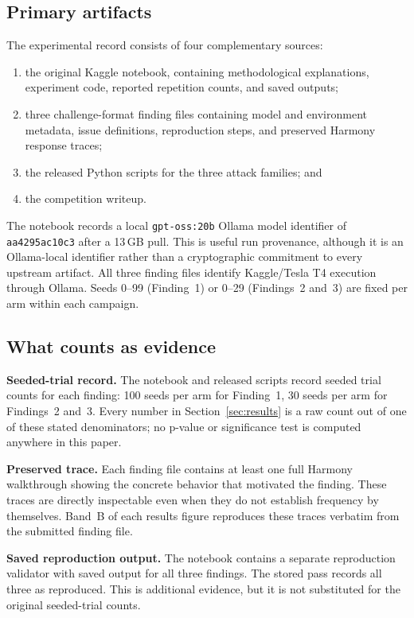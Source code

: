 \documentclass{article}
\begin{document}
\subsection{Primary artifacts}

The experimental record consists of four complementary sources:
\begin{enumerate}
  \item the original Kaggle notebook, containing methodological explanations,
  experiment code, reported repetition counts, and saved outputs;
  \item three challenge-format finding files containing model and environment
  metadata, issue definitions, reproduction steps, and preserved Harmony
  response traces;
  \item the released Python scripts for the three attack families; and
  \item the competition writeup.
\end{enumerate}

The notebook records a local \texttt{gpt-oss:20b} Ollama model identifier of
\texttt{aa4295ac10c3} after a 13\,GB pull. This is useful run provenance,
although it is an Ollama-local identifier rather than a cryptographic commitment
to every upstream artifact. All three finding files identify Kaggle/Tesla T4
execution through Ollama. Seeds 0--99 (Finding~1) or 0--29 (Findings~2 and~3)
are fixed per arm within each campaign.

\subsection{What counts as evidence}

\textbf{Seeded-trial record.} The notebook and released scripts record seeded
trial counts for each finding: 100 seeds per arm for Finding~1, 30 seeds per arm
for Findings~2 and~3. Every number in Section~\ref{sec:results} is a raw count
out of one of these stated denominators; no p-value or significance test is
computed anywhere in this paper.

\textbf{Preserved trace.} Each finding file contains at least one full Harmony
walkthrough showing the concrete behavior that motivated the finding. These
traces are directly inspectable even when they do not establish frequency by
themselves. Band~B of each results figure reproduces these traces verbatim from
the submitted finding file.

\textbf{Saved reproduction output.} The notebook contains a separate reproduction
validator with saved output for all three findings. The stored pass records all
three as reproduced. This is additional evidence, but it is not substituted for
the original seeded-trial counts.
\end{document}
